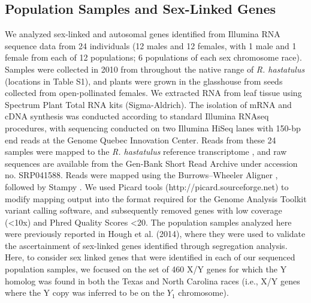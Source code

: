 \documentclass[9pt,twocolumn,twoside]{gsajnl}
\begin{document}
\subsection*{Population Samples and Sex-Linked Genes}
We analyzed sex-linked and autosomal genes identified from Illumina RNA sequence data from 24 individuals (12 males and 12 females, with 1 male and 1 female from each of 12 populations; 6 populations of each sex chromosome race). Samples were collected in 2010 from throughout the native range of \textit{R. hastatulus} (locations in Table S1), and plants were grown in the glasshouse from seeds collected from open-pollinated females. We extracted RNA from leaf tissue using Spectrum Plant Total RNA kits (Sigma-Aldrich). The isolation of mRNA and cDNA synthesis was conducted according to standard Illumina RNAseq procedures, with sequencing conducted on two Illumina HiSeq lanes with 150-bp end reads at the Genome Quebec Innovation Center. Reads from these 24 samples were mapped to the \textit{R. hastatulus} reference transcriptome \citep{hough2014}, and raw sequences are available from the Gen-Bank Short Read Archive under accession no. SRP041588. Reads were mapped using the Burrows–Wheeler Aligner \citep{li2010fast}, followed by Stampy \citep{lunter2011stampy}. We used Picard tools (http://picard.sourceforge.net) to modify mapping output into the format required for the Genome Analysis Toolkit \citep{mckenna2010genome} variant calling software, and subsequently removed genes with low coverage (<10x) and Phred Quality Scores <20. The population samples analyzed here were previously reported in Hough et al. (2014), where they were used to validate the ascertainment of sex-linked genes identified through segregation analysis. Here, to consider sex linked genes that were identified in each of our sequenced population samples, we focused on the set of 460 X/Y genes for which the Y homolog was found in both the Texas and North Carolina races (i.e., X/Y genes where the Y copy was inferred to be on the $Y_{1}$ chromosome).
\end{document}
